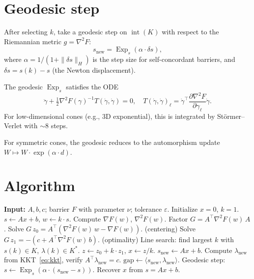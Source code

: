 \documentclass[11pt]{article}
\newcommand{\ip}[2]{\langle #1, #2 \rangle}
\newcommand{\norm}[1]{\|#1\|}
\newcommand{\half}{\tfrac{1}{2}}
\DeclareMathOperator{\Exp}{Exp}
\begin{document}
\section{Geodesic step}

After selecting $k$, take a geodesic step on $\operatorname{int}(K)$ with
respect to the Riemannian metric $g = \nabla^2 F$:
\[
  s_{\text{new}} = \Exp_s(\alpha \cdot \delta s),
\]
where $\alpha = 1/(1 + \norm{\delta s}_H)$ is the step size for self-concordant
barriers, and $\delta s = s(k) - s$ (the Newton displacement).

The geodesic $\Exp_s$ satisfies the ODE
\[
  \ddot\gamma + \half \nabla^2 F(\gamma)^{-1} T(\dot\gamma, \dot\gamma) = 0,
  \quad T(\dot\gamma, \dot\gamma)_\ell = \dot\gamma^\top \frac{\partial \nabla^2 F}{\partial \gamma_\ell} \dot\gamma.
\]
For low-dimensional cones (e.g., 3D exponential), this is integrated by
St\"ormer--Verlet with $\sim$8 steps.

For symmetric cones, the geodesic reduces to the automorphism update
$W \mapsto W \cdot \exp(\alpha \cdot d)$.

\section{Algorithm}

\begin{algorithm}[H]
\caption{Geodesic LP for cones with log-homogeneous barriers}
\begin{algorithmic}[1]
\State \textbf{Input:} $A, b, c$; barrier $F$ with parameter $\nu$; tolerance $\varepsilon$.
\State Initialize $x = 0$, $k = 1$.
\Repeat
  \State $s \gets Ax + b$, \quad $w \gets k \cdot s$.
  \State Compute $\nabla F(w)$, $\nabla^2 F(w)$.
  \State Factor $G = A^\top \nabla^2 F(w) \, A$.
  \State Solve $G \, z_0 = A^\top(\nabla^2 F(w) \, w - \nabla F(w))$.
    \hfill (centering)
  \State Solve $G \, z_1 = -(c + A^\top \nabla^2 F(w) \, b)$.
    \hfill (optimality)
  \State Line search: find largest $k$ with
    $s(k) \in K$, $\lambda(k) \in K^*$.
  \State $z \gets z_0 + k \cdot z_1$, \quad $x \gets z / k$.
  \State $s_{\text{new}} \gets Ax + b$.
  \State Compute $\lambda_{\text{new}}$ from KKT~\eqref{eq:kkt}, verify
    $A^\top \lambda_{\text{new}} = c$.
  \State $\text{gap} \gets \ip{s_{\text{new}}}{\lambda_{\text{new}}}$.
  \State Geodesic step: $s \gets \Exp_s(\alpha \cdot (s_{\text{new}} - s))$.
  \State Recover $x$ from $s = Ax + b$.
\end{algorithmic}
\end{algorithm}
\end{document}
